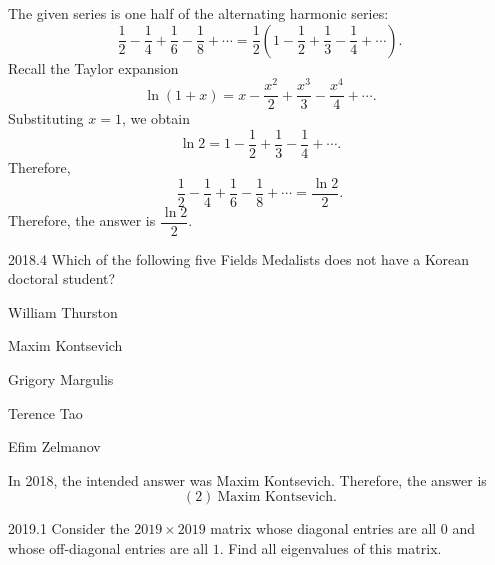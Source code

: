     \begin{solution}
        The given series is one half of the alternating harmonic series:
        \[
            \frac{1}{2}-\frac{1}{4}+\frac{1}{6}-\frac{1}{8}+\cdots
            =
            \frac{1}{2}
            \left(
                1-\frac{1}{2}+\frac{1}{3}-\frac{1}{4}+\cdots
            \right).
        \]
        Recall the Taylor expansion
        \[
            \ln(1+x)
            =
            x-\frac{x^2}{2}+\frac{x^3}{3}-\frac{x^4}{4}+\cdots.
        \]
        Substituting $x=1$, we obtain
        \[
            \ln 2
            =
            1-\frac{1}{2}+\frac{1}{3}-\frac{1}{4}+\cdots.
        \]
        Therefore,
        \[
            \frac{1}{2}-\frac{1}{4}+\frac{1}{6}-\frac{1}{8}+\cdots
            =
            \frac{\ln 2}{2}.
        \]
        Therefore, the answer is $\boxed{\dfrac{\ln 2}{2}}$.
    \end{solution}

    \begin{pastproblem}{2018.4}
        Which of the following five Fields Medalists does not have a Korean doctoral student?
        \begin{problemchoices}
            \item William Thurston
            \item Maxim Kontsevich
            \item Grigory Margulis
            \item Terence Tao
            \item Efim Zelmanov
        \end{problemchoices}
    \end{pastproblem}

    \begin{solution}
        In 2018, the intended answer was Maxim Kontsevich. Therefore, the answer is
        \[
            \boxed{(2)\ \text{Maxim Kontsevich}}.
        \]
    \end{solution}

    \begin{pastproblem}{2019.1}
        Consider the $2019\times 2019$ matrix whose diagonal entries are all $0$ and whose
        off-diagonal entries are all $1$. Find all eigenvalues of this matrix.
    \end{pastproblem}

